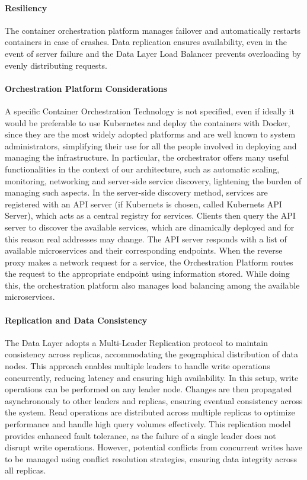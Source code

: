 \paragraph{Resiliency}
The container orchestration platform manages failover and automatically restarts containers in case of crashes.
Data replication ensures availability, even in the event of server failure and the Data Layer Load Balancer prevents overloading by evenly distributing requests.

\paragraph{Orchestration Platform Considerations}
A specific Container Orchestration Technology is not specified, even if ideally it would be preferable to use Kubernetes and deploy the containers with Docker, since they are the most widely adopted platforms and are well known to system administrators, simplifying their use for all the people involved in deploying and managing the infrastructure.
In particular, the orchestrator offers many useful functionalities in the context of our architecture, such as automatic scaling, monitoring, networking and server-side service discovery, lightening the burden of managing such aspects.
In the server-side discovery method, services are registered with an API server (if Kubernets is chosen, called Kubernets API Server), which acts as a central registry for services. Clients then query the API server to discover the available services, which are dinamically deployed and for this reason real addresses may change. The API server responds with a list of available microservices and their corresponding endpoints. When the reverse proxy makes a network request for a service, the Orchestration Platform routes the request to the appropriate endpoint using information stored. While doing this, the orchestration platform also manages load balancing among the available microservices.

\paragraph{Replication and Data Consistency}
The Data Layer adopts a Multi-Leader Replication protocol to maintain consistency across replicas, accommodating the geographical distribution of data nodes. This approach enables multiple leaders to handle write operations concurrently, reducing latency and ensuring high availability.
In this setup, write operations can be performed on any leader node. Changes are then propagated asynchronously to other leaders and replicas, ensuring eventual consistency across the system.
Read operations are distributed across multiple replicas to optimize performance and handle high query volumes effectively.
This replication model provides enhanced fault tolerance, as the failure of a single leader does not disrupt write operations. However, potential conflicts from concurrent writes have to be managed using conflict resolution strategies, ensuring data integrity across all replicas.

